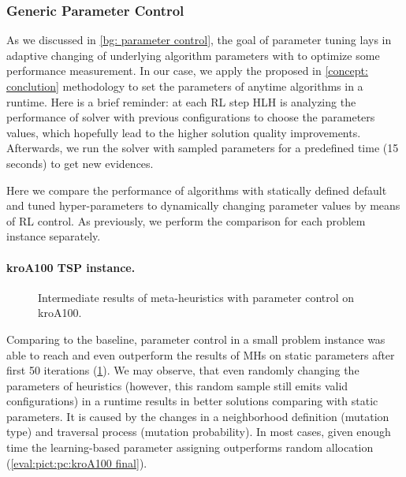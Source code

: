 \subsubsection{Generic Parameter Control}
As we discussed in \cref{bg: parameter control}, the goal of parameter tuning lays in adaptive changing of underlying algorithm parameters with to optimize some performance measurement. In our case, we apply the proposed in \cref{concept: conclution} methodology to set the parameters of anytime algorithms in a runtime. Here is a brief reminder: at each RL step HLH is analyzing the performance of solver with previous configurations to choose the parameters values, which hopefully lead to the higher solution quality improvements. Afterwards, we run the solver with sampled parameters for a predefined time (15 seconds) to get new evidences. 

Here we compare the performance of algorithms with statically defined default and tuned hyper-parameters to dynamically changing parameter values by means of RL control. As previously, we perform the comparison for each problem instance separately.

\newpage
\paragraph{kroA100 TSP instance.}
\begin{figure}[t]
	\centering
	
	\caption{Intermediate results of meta-heuristics with parameter control on kroA100.}
	\label{eval:pict:pc:kroA100 intermediate}
\end{figure}

Comparing to the baseline, parameter control in a small problem instance was able to reach and even outperform the results of MHs on static parameters after first 50 iterations (\cref{eval:pict:pc:kroA100 intermediate}). We may observe, that even randomly changing the parameters of heuristics (however, this random sample still emits valid configurations) in a runtime results in better solutions comparing with static parameters. It is caused by the changes in a neighborhood definition (mutation type) and traversal process (mutation probability). In most cases, given enough time the learning-based parameter assigning outperforms random allocation (\cref{eval:pict:pc:kroA100 final}).

